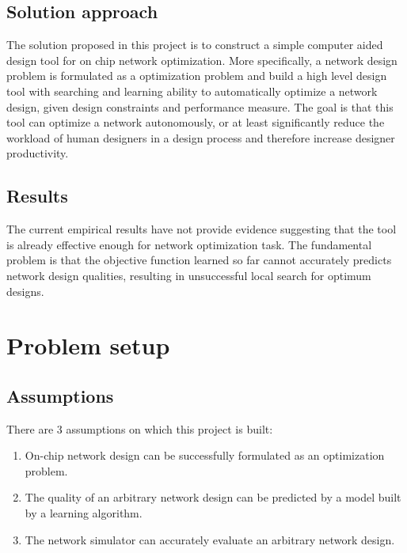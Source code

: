\documentclass[12pt]{article}
\theoremstyle{definition}
\begin{document}
\subsection{Solution approach}
The solution proposed in this project is to construct a simple computer aided design tool for on chip network optimization. More specifically, a network design problem is formulated as a optimization problem and build a high level design tool with searching \cite{ganguly2011scalable} and learning ability to automatically optimize a network design, given design constraints and performance measure. The goal is that this tool can optimize a network autonomously, or at least significantly reduce the workload of human designers in a design process and therefore increase designer productivity.
\subsection{Results}
The current empirical results have not provide evidence suggesting that the tool is already effective enough for network optimization task. The fundamental problem is that the objective function learned so far cannot accurately predicts network design qualities, resulting in unsuccessful local search for optimum designs.

\section{Problem setup}
\subsection{Assumptions}
There are 3 assumptions on which this project is built:
\begin{enumerate}
\item On-chip network design can be successfully formulated as an optimization problem.
\item The quality of an arbitrary network design can be predicted by a model built by a learning algorithm.
\item The network simulator can accurately evaluate an arbitrary network design.
\end{enumerate}
\end{document}
